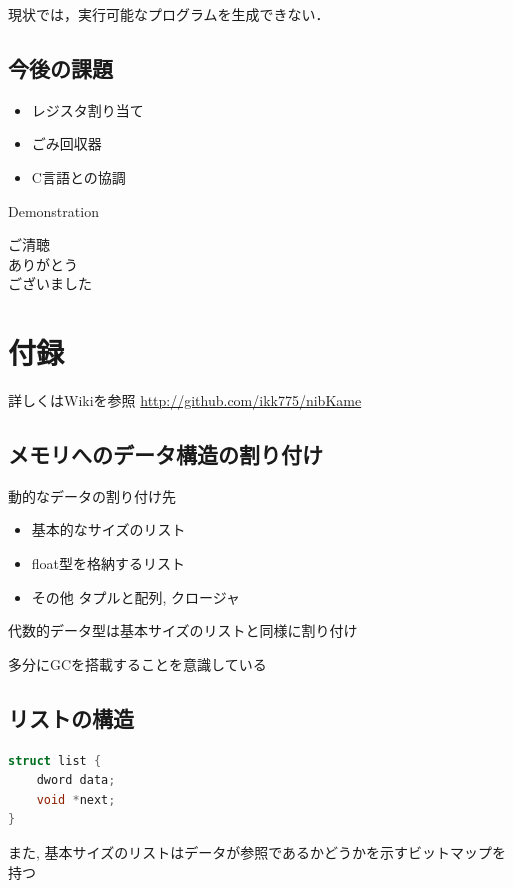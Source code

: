 \documentclass[papersize,30pt,slide]{jsarticle}
\begin{document}
現状では，実行可能なプログラムを生成できない．

\subsection{今後の課題}
\begin{itemize}
\item レジスタ割り当て
\item ごみ回収器
\item C言語との協調
\end{itemize}

\newpage
\vspace*{1\fill }
\begin{center}
\Huge Demonstration
\end{center}
\vspace*{1\fill }

\newpage
\vspace*{1\fill }
\begin{center}
\Huge ご清聴\\ありがとう\\ございました
\end{center}
\vspace*{1\fill }

\section{付録}
詳しくはWikiを参照
\url{http://github.com/ikk775/nibKame}

\subsection{メモリへのデータ構造の割り付け}
動的なデータの割り付け先
\begin{itemize}
\item 基本的なサイズのリスト
\item float型を格納するリスト
\item その他 タプルと配列, クロージャ
\end{itemize}
代数的データ型は基本サイズのリストと同様に割り付け

多分にGCを搭載することを意識している

\newpage
\subsection{リストの構造}
\begin{lstlisting}[language=C]
struct list {
    dword data;
    void *next;
}
\end{lstlisting}
また, 基本サイズのリストはデータが参照であるかどうかを示すビットマップを持つ
\end{document}
